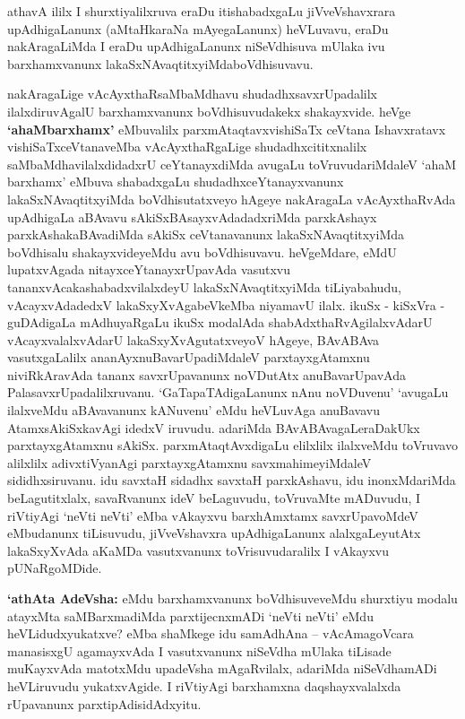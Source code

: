 \centerline{}

\begin{artha}
athavA ililx I shurxtiyalilxruva eraDu itishabadxgaLu jiVveVshavxrara
upAdhigaLanunx (aMtaHkaraNa mAyegaLanunx) heVLuvavu, eraDu
nakAragaLiMda I eraDu upAdhigaLanunx niSeVdhisuva mUlaka ivu
barxhamxvanunx lakaSxNAvaqtitxyiMda\break boVdhisuvavu.

nakAragaLige vAcAyxthaRsaMbaMdhavu shudadhxsavxrUpadalilx
ilalxdiruvAgalU barxhamxvanunx boVdhisuvudakekx shakayxvide. heVge
\textbf{`ahaMbarxhamx'} eMbuvalilx parxmAtaqtavxvishiSaTx ceVtana Ishavxratavx
vishiSaTxceVtanaveMba vAcAyxthaRgaLige shudadhxcititxnalilx
saMbaMdhavilalxdidadxrU ceYtanayxdiMda avugaLu toVruvudariMdaleV `ahaM
barxhamx' eMbuva shabadxgaLu shudadhxceYtanayxvanunx
lakaSxNAvaqtitxyiMda boVdhisutatxveyo hAgeye nakAragaLa vAcAyxthaRvAda
upAdhigaLa aBAvavu sAkiSxBAsayxvAdadadxriMda parxkAshayx
parxkAshakaBAvadiMda sAkiSx ceVtanavanunx lakaSxNAvaqtitxyiMda
boVdhisalu shakayxvideyeMdu avu boVdhisuvavu. heVgeMdare,
eMdU lupatxvAgada nitayxceYtanayxrUpavAda vasutxvu
tananxvAcakashabadxvilalxdeyU lakaSxNAvaqtitxyiMda tiLiyabahudu,
vAcayxvAdadedxV lakaSxyXvAgabeVkeMba niyamavU ilalx. ikuSx - kiSxVra -
guDAdigaLa mAdhuyaRgaLu ikuSx modalAda shabAdxthaRvAgilalxvAdarU vAcayxvalalxvAdarU lakaSxyXvAgutatxveyoV hAgeye, BAvABAva
vasutxgaLalilx ananAyxnuBavarUpadiMdaleV parxtayxgAtamxnu
niviRkAravAda tananx savxrUpavanunx noVDutAtx anuBavarUpavAda
PalasavxrUpadalilxruvanu. `GaTapaTAdigaLanunx nAnu noVDuvenu'
`avugaLu ilalxveMdu aBAvavanunx kANuvenu' eMdu heVLuvAga anuBavavu
AtamxsAkiSxkavAgi idedxV iruvudu. adariMda BAvABAvagaLeraDakUkx
parxtayxgAtamxnu sAkiSx. parxmAtaqtAvxdigaLu elilxlilx ilalxveMdu
toVruvavo alilxlilx adivxtiVyanAgi parxtayxgAtamxnu savxmahimeyiMdaleV
sididhxsiruvanu. idu savxtaH sidadhx savxtaH parxkAshavu, idu
inonxMdariMda beLagutitxlalx, savaRvanunx ideV beLaguvudu, toVruvaMte
mADuvudu, I riVtiyAgi `neVti neVti' eMba vAkayxvu barxhAmxtamx
savxrUpavoMdeV eMbudanunx tiLisuvudu, jiVveVshavxra upAdhigaLanunx
alalxgaLeyutAtx lakaSxyXvAda aKaMDa vasutxvanunx toVrisuvudaralilx I
vAkayxvu pUNaRgoMDide.

\textbf{`athAta AdeVsha:} eMdu barxhamxvanunx boVdhisuveveMdu shurxtiyu modalu
atayxMta saMBarxmadiMda parxtijecnxmADi `neVti neVti' eMdu heVLidudxyukatxve? eMba shaMkege
idu samAdhAna -- vAcAmagoVcara manasisxgU agamayxvAda I vasutxvanunx
niSeVdha mUlaka tiLisade muKayxvAda matotxMdu upadeVsha mAgaRvilalx,
adariMda niSeVdhamADi heVLiruvudu yukatxvAgide. I riVtiyAgi barxhamxna
daqshayxvalalxda rUpavanunx parxtipAdisidAdxyitu.
\end{artha}

